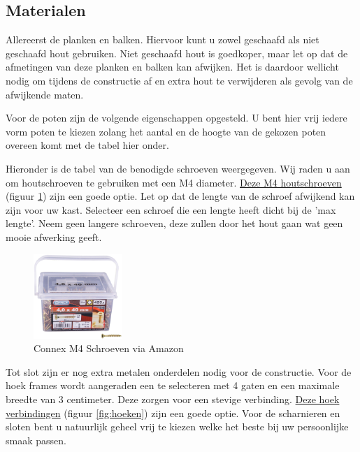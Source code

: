 \documentclass{article}
\begin{document}
\subsection{Materialen}

Allereerst de planken en balken. Hiervoor kunt u zowel geschaafd als niet geschaafd hout gebruiken. Niet geschaafd hout is goedkoper, maar let op dat de afmetingen van deze planken en balken kan afwijken.  Het is daardoor wellicht nodig om tijdens de constructie af en extra hout te verwijderen als gevolg van de afwijkende maten.



Voor de poten zijn de volgende eigenschappen opgesteld. U bent hier vrij iedere vorm poten te kiezen zolang het aantal en de hoogte van de gekozen poten overeen komt met de tabel hier onder.



Hieronder is de tabel van de benodigde schroeven weergegeven. Wij raden u aan om houtschroeven te gebruiken met een M4 diameter. \href{https://www.amazon.nl/gp/product/B00B214ZLQ/ref=ppx_yo_dt_b_asin_title_o07_s00?ie=UTF8&psc=1}{Deze M4 houtschroeven} (figuur \ref{fig:schroeven}) zijn een goede optie. Let op dat de lengte van de schroef afwijkend kan zijn voor uw kast. Selecteer een schroef die een lengte heeft dicht bij de 'max lengte'. Neem geen langere schroeven, deze zullen door het hout gaan wat geen mooie afwerking geeft.



\begin{figure}[h!]
    \centering
    \includegraphics[width=0.3\textwidth]{schroeven.png}
    \caption{Connex M4 Schroeven via Amazon}
    \label{fig:schroeven}
\end{figure}

\clearpage
\newpage

Tot slot zijn er nog extra metalen onderdelen nodig voor de constructie. Voor de hoek frames wordt aangeraden een te selecteren met 4 gaten en een maximale breedte van 3 centimeter. Deze zorgen voor een stevige verbinding. \href{https://www.amazon.nl/Connex-HVG2400-voordeelpak-hoekverbinder-verzinkt/dp/B00J7L2ET8/ref=sr_1_9?__mk_nl_NL=%C3%85M%C3%85%C5%BD%C3%95%C3%91&crid=22ED59WFFPB0Z&keywords=hoekverbinder&qid=1660427081&sprefix=hoekverbinder%2Caps%2C85&sr=8-9}{Deze hoek verbindingen} (figuur \ref{fig:hoeken}) zijn een goede optie. Voor de scharnieren en sloten bent u natuurlijk geheel vrij te kiezen welke het beste bij uw persoonlijke smaak passen.
\end{document}
